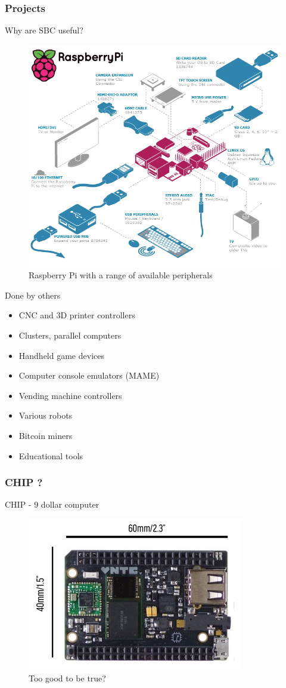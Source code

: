 \documentclass[hyperref={unicode}]{beamer}
\begin{document}
\subsubsection{Projects}

\begin{frame}{Why are SBC useful?}
\begin{figure}
\includegraphics[width=.7\textwidth]{raspi-peripherals.png}
\caption{Raspberry Pi with a range of available peripherals}
\end{figure}
\end{frame}


\begin{frame}{Done by others}
	\begin{itemize}
	\item CNC and 	3D printer controllers
	\item Clusters, parallel computers	
	\item Handheld game devices
	\item Computer console emulators (MAME)
	\item Vending machine controllers
	\item Various robots
	\item Bitcoin miners
	\item Educational tools
	\end{itemize}
\end{frame}

\subsubsection{CHIP ?}

\begin{frame}{CHIP - 9 dollar computer}
	\begin{figure}
	\includegraphics[width=.5\textwidth]{chip.jpg}
	\caption{Too good to be true?}
	\end{figure}
\end{frame}
\end{document}
